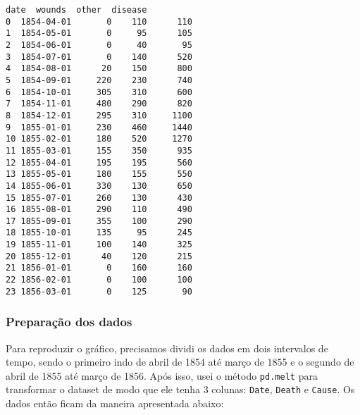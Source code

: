\documentclass[11pt]{article}
\makeatletter
\newcommand{\boxspacing}{\kern\kvtcb@left@rule\kern\kvtcb@boxsep}
\newcommand{\prompt}[4]{
        {\ttfamily\llap{{\color{#2}[#3]:\hspace{3pt}#4}}\vspace{-\baselineskip}}
    }
\makeatother
\begin{document}
            \begin{tcolorbox}[breakable, size=fbox, boxrule=.5pt, pad at break*=1mm, opacityfill=0]
\prompt{Out}{outcolor}{2}{\boxspacing}
\begin{Verbatim}[commandchars=\\\{\}]
         date  wounds  other  disease
0  1854-04-01       0    110      110
1  1854-05-01       0     95      105
2  1854-06-01       0     40       95
3  1854-07-01       0    140      520
4  1854-08-01      20    150      800
5  1854-09-01     220    230      740
6  1854-10-01     305    310      600
7  1854-11-01     480    290      820
8  1854-12-01     295    310     1100
9  1855-01-01     230    460     1440
10 1855-02-01     180    520     1270
11 1855-03-01     155    350      935
12 1855-04-01     195    195      560
13 1855-05-01     180    155      550
14 1855-06-01     330    130      650
15 1855-07-01     260    130      430
16 1855-08-01     290    110      490
17 1855-09-01     355    100      290
18 1855-10-01     135     95      245
19 1855-11-01     100    140      325
20 1855-12-01      40    120      215
21 1856-01-01       0    160      160
22 1856-02-01       0    100      100
23 1856-03-01       0    125       90
\end{Verbatim}
\end{tcolorbox}
        
    \hypertarget{preparauxe7uxe3o-dos-dados}{%
\subsubsection{Preparação dos dados}\label{preparauxe7uxe3o-dos-dados}}

    Para reproduzir o gráfico, precisamos dividi os dados em dois intervalos
de tempo, sendo o primeiro indo de abril de 1854 até março de 1855 e o
segundo de abril de 1855 até março de 1856. Após isso, usei o método
\texttt{pd.melt} para transformar o dataset de modo que ele tenha 3
colunas: \texttt{Date}, \texttt{Death} e \texttt{Cause}. Os dados então
ficam da maneira apresentada abaixo:
\end{document}
